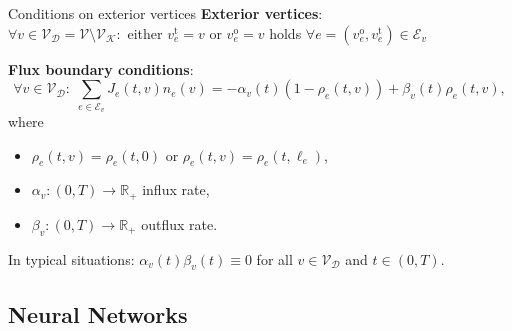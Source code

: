 \documentclass[9pt]{beamer}
\begin{document}
\begin{frame}{Conditions on exterior vertices}
    \textbf{Exterior vertices}: \\
    $\forall v \in \mathcal{V}_\mathcal{D} = \mathcal{V} \setminus \mathcal{V}_\mathcal{K} \colon$ either $v^{\operatorname{t}}_{e} = v$ or $v^{\operatorname{o}}_{e} = v$ holds $\forall e = \left(v^{\operatorname{o}}_{e}, v^{\operatorname{t}}_{e}\right) \in \mathcal{E}_v$ \\

    \vspace{5mm} 

    \textbf{Flux boundary conditions}:
    \begin{equation*}
        \forall v \in \mathcal{V}_\mathcal{D} \colon \; \sum_{e\in \mathcal{E}_v}J_e \left( t, v \right)  n_e  \left( v \right) =-\alpha_v \left( t \right)   \left( 1-\rho_e \left(t, v \right) \right)  + \beta_v \left( t \right)  \rho_e \left(t, v \right),
    \end{equation*}
    where 
    \begin{itemize}
        \item $\rho_e \left(t, v \right) = \rho_e \left(t, 0 \right)$ or $\rho_e \left(t, v \right) = \rho_e \left(t, \ell_e \right)$,
        \item $\alpha_v \colon  \left( 0,T \right)  \to \mathbb{R}_{+}$ influx rate,
        \item $\beta_v \colon  \left( 0,T \right)  \to \mathbb{R}_{+}$ outflux rate.
    \end{itemize}
    In typical situations: $\alpha_v \left( t \right)  \beta_v \left( t \right)  \equiv 0$ for all $v \in \mathcal{V}_\mathcal{D}$ and $t \in  \left( 0,T \right) $.
\end{frame}



\subsection{Neural Networks}
\end{document}
